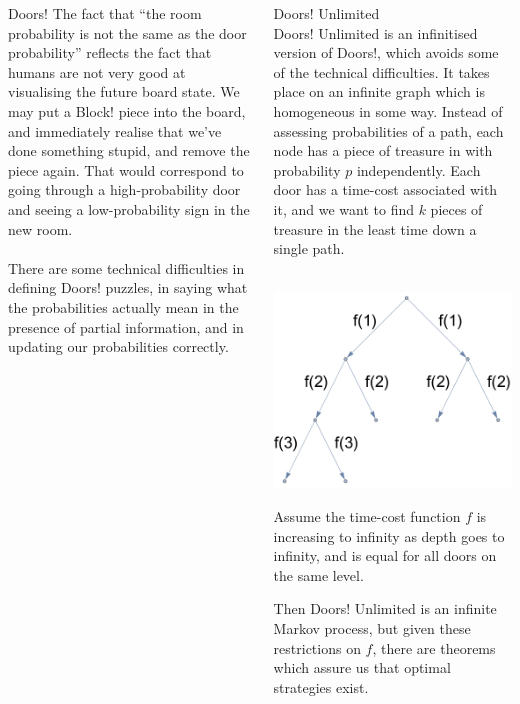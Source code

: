 \documentclass[final]{beamer}
\begin{document}
\begin{columns}[t]
\begin{column}{.3 \linewidth}
\begin{block}{Doors!}
The fact that ``the room probability is not the same as the door probability'' reflects the fact that humans are not very good at visualising the future board state.
We may put a Block! piece into the board, and immediately realise that we've done something stupid, and remove the piece again.
That would correspond to going through a high-probability door and seeing a low-probability sign in the new room. \\~\\

There are some technical difficulties in defining Doors! puzzles, in saying what the probabilities actually mean in the presence of partial information, and in updating our probabilities correctly.
\end{block}
\end{column}

\begin{column}{.3 \linewidth}

\begin{block}{Doors! Unlimited}\ \\
Doors! Unlimited is an infinitised version of Doors!, which avoids some of the technical difficulties.
It takes place on an infinite graph which is homogeneous in some way.
Instead of assessing probabilities of a path, each node has a piece of treasure in with probability $p$ independently.
Each door has a time-cost associated with it, and we want to find $k$ pieces of treasure in the least time down a single path. \\~\\

\begin{center}
\includegraphics[width=0.25 \linewidth]{doorsunlimitedgraph}
\end{center}

Assume the time-cost function $f$ is increasing to infinity as depth goes to infinity, and is equal for all doors on the same level.

Then Doors! Unlimited is an infinite Markov process, but given these restrictions on $f$, there are theorems which assure us that optimal strategies exist. \\~\\


\end{block}
\end{column}
\end{columns}
\end{document}
